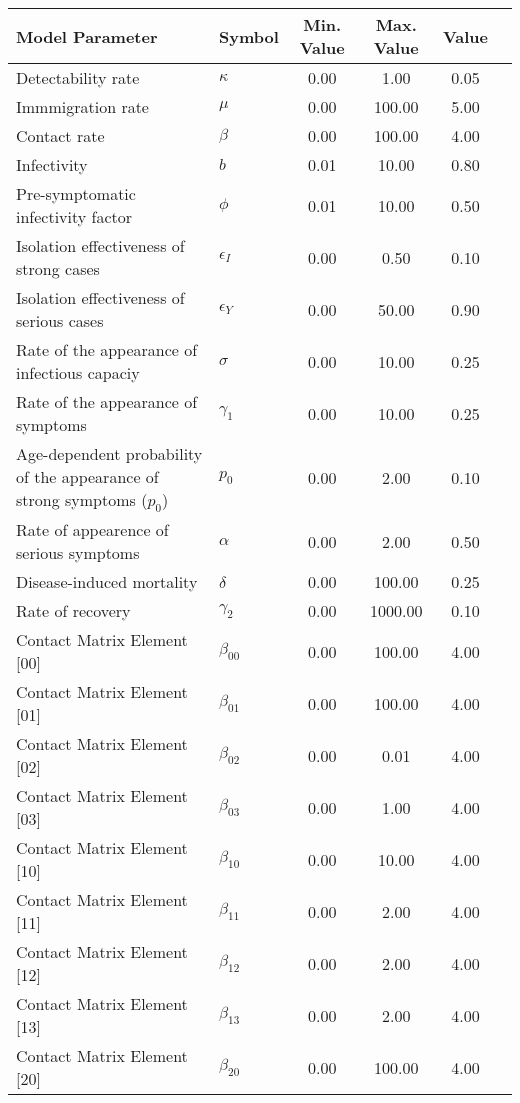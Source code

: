 \begin{table}
\centering
\begin{tabular}{p{5cm}lcccc}
{\bf Model Parameter} & {\bf Symbol} & {\bf Min. Value} & {\bf Max. Value} & {\bf Value}\\
\hline\hline
Detectability rate & $\kappa$ & 0.00 & 1.00 & 0.05\\
Immmigration rate & $\mu$ & 0.00 & 100.00 & 5.00\\
Contact rate & $\beta$ & 0.00 & 100.00 & 4.00\\
Infectivity & $b$ & 0.01 & 10.00 & 0.80\\
Pre-symptomatic infectivity factor & $\phi$ & 0.01 & 10.00 & 0.50\\
Isolation effectiveness of strong cases & $\epsilon_I$ & 0.00 & 0.50 & 0.10\\
Isolation effectiveness of serious cases & $\epsilon_Y$ & 0.00 & 50.00 & 0.90\\
Rate of the appearance of infectious capaciy & $\sigma$ & 0.00 & 10.00 & 0.25\\
Rate of the appearance of symptoms & $\gamma_1$ & 0.00 & 10.00 & 0.25\\
Age-dependent probability of the appearance of strong symptoms ($p_0$) & $p_0$ & 0.00 & 2.00 & 0.10\\
Rate of appearence of serious symptoms & $\alpha$ & 0.00 & 2.00 & 0.50\\
Disease-induced mortality & $\delta$ & 0.00 & 100.00 & 0.25\\
Rate of recovery & $\gamma_2$ & 0.00 & 1000.00 & 0.10\\
Contact Matrix Element [00] & $\beta_{00}$ & 0.00 & 100.00 & 4.00\\
Contact Matrix Element [01] & $\beta_{01}$ & 0.00 & 100.00 & 4.00\\
Contact Matrix Element [02] & $\beta_{02}$ & 0.00 & 0.01 & 4.00\\
Contact Matrix Element [03] & $\beta_{03}$ & 0.00 & 1.00 & 4.00\\
Contact Matrix Element [10] & $\beta_{10}$ & 0.00 & 10.00 & 4.00\\
Contact Matrix Element [11] & $\beta_{11}$ & 0.00 & 2.00 & 4.00\\
Contact Matrix Element [12] & $\beta_{12}$ & 0.00 & 2.00 & 4.00\\
Contact Matrix Element [13] & $\beta_{13}$ & 0.00 & 2.00 & 4.00\\
Contact Matrix Element [20] & $\beta_{20}$ & 0.00 & 100.00 & 4.00\\

\end{tabular}
\end{table}
